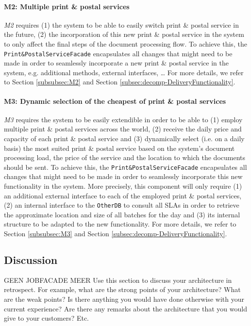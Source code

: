 \documentclass[a4paper,10pt]{article}
\begin{document}
\paragraph{M2\@: Multiple print \& postal services}
\textit{M2} requires (1) the system to be able to easily switch print \& postal service in the future, (2) the incorporation of this new print \& postal service in the system to only affect the final steps of the document processing flow. To achieve this, the \texttt{Print\&PostalServiceFacade} encapsulates all changes that might need to be made in order to seamlessly incorporate a new print \& postal service in the system, e.g. additional methods, external interfaces, \dots
For more details, we refer to Section \ref{subsubsec:M2} and Section \ref{subsec:decomp-DeliveryFunctionality}.

\paragraph{M3\@: Dynamic selection of the cheapest of print \& postal services}
\textit{M3} requires the system to be easily extendible in order to be able to (1) employ multiple print \& postal services across the world, (2) receive the daily price and capacity of each print \& postal service and (3) dynamically select (i.e. on a daily basis) the most suited print \& postal service based on the system's document processing load, the price of the service and the location to which the documents should be sent. To achieve this, the \texttt{Print\&PostalServiceFacade} encapsulates all changes that might need to be made in order to seamlessly incorporate this new functionality in the system. More precisely, this component will only require (1) an additional external interface to each of the employed print \& postal services, (2) an internal interface to the \texttt{OtherDB} to consult all SLAs in order to retrieve the approximate location and size of all batches for the day and (3) its internal structure to be adapted to the new functionality.
For more details, we refer to Section \ref{subsubsec:M3} and Section \ref{subsec:decomp-DeliveryFunctionality}.

\subsection{Discussion}
GEEN JOBFACADE MEER
Use this section to discuss your architecture in retrospect.
For example, what are the strong points of your architecture?
What are the weak points? Is there anything you would have done otherwise with
your current experience?
Are there any remarks about the architecture that you would give to your
customers?
Etc.
\end{document}

